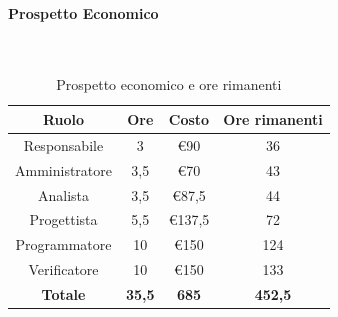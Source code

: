 \documentclass{article}
\begin{document}
                \paragraph{Prospetto Economico}\mbox{}\\
                \begin{table}[H]
                    \centering
                    \begin{tabular}{|c|c|c|c|}
                    \hline
                    \textbf{Ruolo}  & \textbf{Ore}  & \textbf{Costo} & \textbf{Ore rimanenti} \\ \hline
                    Responsabile    & 3             & €90            & 36                     \\ \hline
                    Amministratore  & 3,5           & €70            & 43                   \\ \hline
                    Analista        & 3,5           & €87,5          & 44                   \\ \hline
                    Progettista     & 5,5           & €137,5         & 72                   \\ \hline
                    Programmatore   & 10            & €150           & 124                    \\ \hline
                    Verificatore    & 10            & €150           & 133                    \\ \hline
                    \textbf{Totale} & \textbf{35,5} & \textbf{685}   & \textbf{452,5}         \\ \hline
                    \end{tabular}
                    \caption{Prospetto economico e ore rimanenti}
                \end{table}
\end{document}
